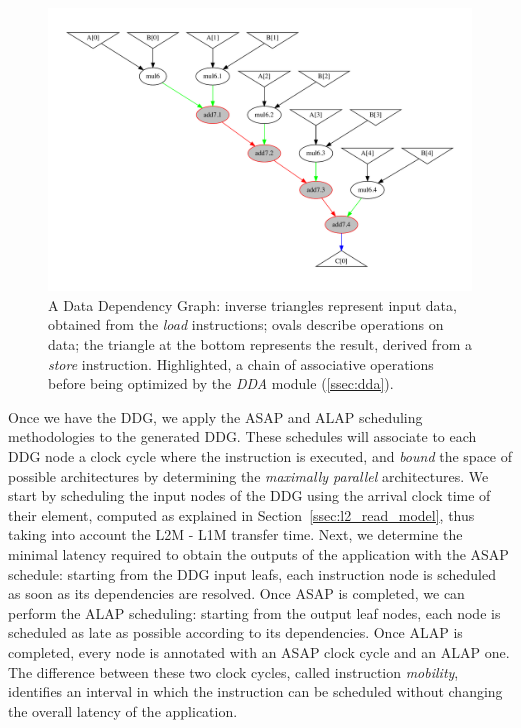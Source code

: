 \begin{figure}[tb]
\centering
\includegraphics[width=.9\columnwidth,left]{images/supernode_2.pdf}
\caption{\small A Data Dependency Graph: inverse triangles represent input data, obtained from the \textit{load} instructions; ovals describe operations on data; the triangle at the bottom represents the result, derived from a \textit{store} instruction. Highlighted, a chain of associative operations before being optimized by the \textit{DDA} module (\ref{ssec:dda}).}
\label{fig:ddg}
\end{figure}

Once we have the DDG, we apply the ASAP and ALAP scheduling methodologies to the generated DDG. These schedules will associate to each DDG node a clock cycle where the instruction is executed, and \textit{bound} the space of possible architectures by determining the \textit{maximally parallel} architectures. We start by scheduling the input nodes of the DDG using the arrival clock time of their element, computed as explained in Section~\ref{ssec:l2_read_model}, thus taking into account the L2M - L1M transfer time. Next, we determine the minimal latency required to obtain the outputs of the application with the ASAP schedule: starting from the DDG input leafs, each instruction node is scheduled as soon as its dependencies are resolved.
Once ASAP is completed, we can perform the ALAP scheduling: starting from the output leaf nodes, each node is scheduled as late as possible according to its dependencies. Once ALAP is completed, every node is annotated with an ASAP clock cycle and an ALAP one. The difference between these two clock cycles, called instruction \textit{mobility}, identifies an interval in which the instruction can be scheduled without changing the overall latency of the application.

